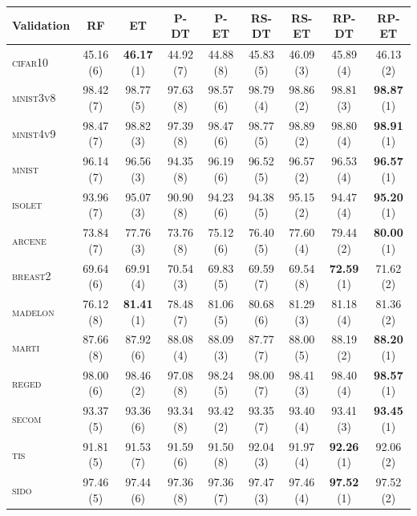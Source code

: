 \begin{table}
    \centering
    \footnotesize
    \hspace{-3.2cm}
\begin{tabular}{|l|cccccccc|}
\hline
\textbf{Validation} & RF & ET & P-DT & P-ET & RS-DT & RS-ET & RP-DT & RP-ET \\
\hline
\hline
    \textsc{cifar10 }  &  45.16 (6)  &  \textbf{46.17} (1)  &  44.92 (7)  &  44.88 (8)  &  45.83 (5)  &  46.09 (3)  &  45.89 (4)  &  46.13 (2) \\
    \textsc{mnist3v8}  &  98.42 (7)  &  98.77 (5)  &  97.63 (8)  &  98.57 (6)  &  98.79 (4)  &  98.86 (2)  &  98.81 (3)  &  \textbf{98.87} (1) \\
    \textsc{mnist4v9}  &  98.47 (7)  &  98.82 (3)  &  97.39 (8)  &  98.47 (6)  &  98.77 (5)  &  98.89 (2)  &  98.80 (4)  &  \textbf{98.91} (1) \\
    \textsc{mnist   }  &  96.14 (7)  &  96.56 (3)  &  94.35 (8)  &  96.19 (6)  &  96.52 (5)  &  96.57 (2)  &  96.53 (4)  &  \textbf{96.57} (1) \\
    \textsc{isolet  }  &  93.96 (7)  &  95.07 (3)  &  90.90 (8)  &  94.23 (6)  &  94.38 (5)  &  95.15 (2)  &  94.47 (4)  &  \textbf{95.20} (1) \\
    \textsc{arcene  }  &  73.84 (7)  &  77.76 (3)  &  73.76 (8)  &  75.12 (6)  &  76.40 (5)  &  77.60 (4)  &  79.44 (2)  &  \textbf{80.00} (1) \\
    \textsc{breast2 }  &  69.64 (6)  &  69.91 (4)  &  70.54 (3)  &  69.83 (5)  &  69.59 (7)  &  69.54 (8)  &  \textbf{72.59} (1)  &  71.62 (2) \\
    \textsc{madelon }  &  76.12 (8)  &  \textbf{81.41} (1)  &  78.48 (7)  &  81.06 (5)  &  80.68 (6)  &  81.29 (3)  &  81.18 (4)  &  81.36 (2) \\
    \textsc{marti   }  &  87.66 (8)  &  87.92 (6)  &  88.08 (4)  &  88.09 (3)  &  87.77 (7)  &  88.00 (5)  &  88.19 (2)  &  \textbf{88.20} (1) \\
    \textsc{reged   }  &  98.00 (6)  &  98.46 (2)  &  97.08 (8)  &  98.24 (5)  &  98.00 (7)  &  98.41 (3)  &  98.40 (4)  &  \textbf{98.57} (1) \\
    \textsc{secom   }  &  93.37 (5)  &  93.36 (6)  &  93.34 (8)  &  93.42 (2)  &  93.35 (7)  &  93.40 (4)  &  93.41 (3)  &  \textbf{93.45} (1) \\
    \textsc{tis     }  &  91.81 (5)  &  91.53 (7)  &  91.59 (6)  &  91.50 (8)  &  92.04 (3)  &  91.97 (4)  &  \textbf{92.26} (1)  &  92.06 (2) \\
    \textsc{sido    }  &  97.46 (5)  &  97.44 (6)  &  97.36 (8)  &  97.36 (7)  &  97.47 (3)  &  97.46 (4)  &  \textbf{97.52} (1)  &  97.52 (2) \\

\end{tabular}
\end{table}
